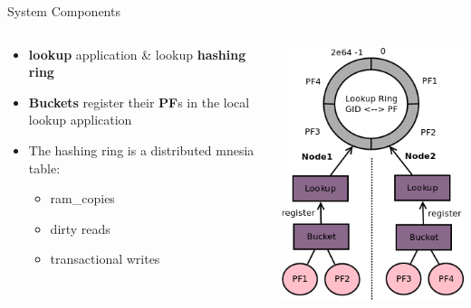\documentclass[aspectratio=169]{beamer}
\begin{document}
\begin{frame}{System Components}
    \begin{columns}
        \begin{column}[c]{0.6\textwidth}
            \begin{itemize}
                \item \textbf{lookup} application \& lookup \textbf{hashing ring}
                \item \textbf{Buckets} register their \textbf{PF}s in the local lookup application
                \item The hashing ring is a distributed mnesia table:
                    \begin{itemize}
                        \item ram\_copies
                        \item dirty reads
                        \item transactional writes
                    \end{itemize}
            \end{itemize}
        \end{column}
        \begin{column}[c]{0.4\textwidth}
            \includegraphics[height=0.7\textheight]{images/components.png}
        \end{column}
    \end{columns}
\end{frame}
\end{document}
